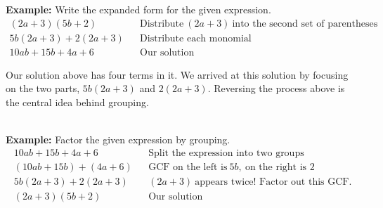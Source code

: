 \documentclass[12pt]{article}
\theoremstyle{definition}
\begin{document}
{\bf Example:} Write the expanded form for the given expression.
  \begin{eqnarray*}
    (2 a + 3) (5 b + 2) &  & \text{Distribute} \ (2 a + 3) \ \text{into the second set of parentheses}\\
    5 b (2 a + 3) + 2 (2 a + 3) &  & \text{Distribute each monomial}\\
    10ab + 15 b + 4 a + 6 &  & \text{Our solution}
  \end{eqnarray*}

Our solution above has four terms in it.  We arrived at this solution by focusing on the two parts, $5 b (2 a + 3)$ and $2 (2 a + 3)$.  Reversing the process above is the central idea behind grouping.\\
\ \par
{\bf Example:} Factor the given expression by grouping.
  \begin{eqnarray*}
    10 ab + 15 b + 4 a + 6 &  & \text{Split the expression into two groups}\\
(10 ab + 15 b) + (4 a + 6)&  & \text{GCF on the left is} \ 5 b, \ \text{on the right is 2}\\
5 b (2 a + 3) + 2 (2 a + 3) &  & (2 a + 3) \ \text{appears twice! Factor out this GCF.}\\
    (2 a + 3) (5 b + 2) &  & \text{Our solution}
  \end{eqnarray*}
	
\end{document}
